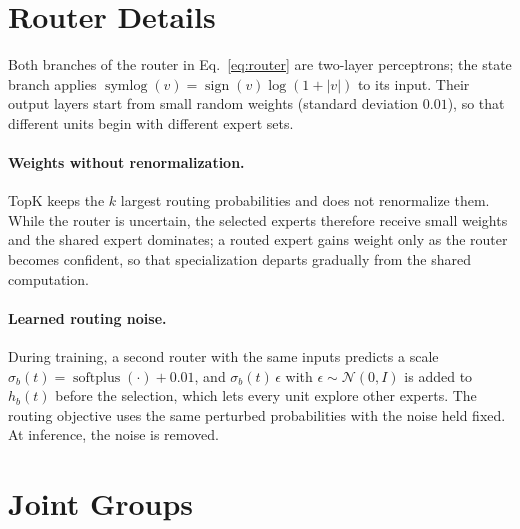 
\section{Router Details}
\label{supp:router}

Both branches of the router in Eq.~\eqref{eq:router} are two-layer perceptrons; the state branch applies
$\operatorname{symlog}(v)=\operatorname{sign}(v)\log(1+|v|)$ to its input. Their output layers start from small random
weights (standard deviation $0.01$), so that different units begin with different expert sets.

\paragraph{Weights without renormalization.}
TopK keeps the $k$ largest routing probabilities and does not renormalize them. While the router is uncertain, the
selected experts therefore receive small weights and the shared expert dominates; a routed expert gains weight only
as the router becomes confident, so that specialization departs gradually from the shared computation.

\paragraph{Learned routing noise.}
During training, a second router with the same inputs predicts a scale
$\sigma_b(t)=\operatorname{softplus}(\cdot)+0.01$, and $\sigma_b(t)\,\epsilon$ with $\epsilon\sim\mathcal{N}(0,I)$ is
added to $h_b(t)$ before the selection, which lets every unit explore other experts. The routing objective uses the
same perturbed probabilities with the noise held fixed. At inference, the noise is removed.

\section{Joint Groups}
\label{supp:groups}

